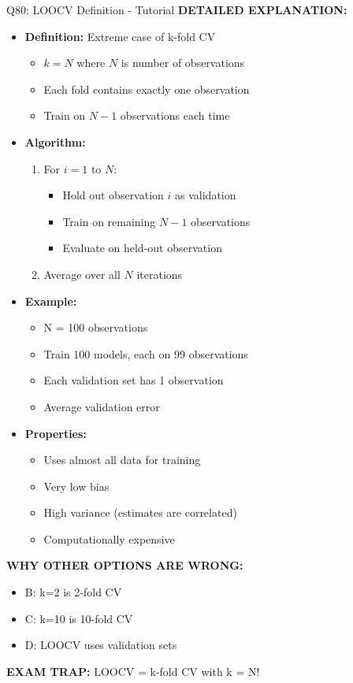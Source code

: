\documentclass[8pt]{beamer}
\begin{document}
\begin{frame}{Q80: LOOCV Definition - Tutorial}
		\vspace{0.05cm}
		\textbf{DETAILED EXPLANATION:}
		\begin{itemize}
			\item \textbf{Definition:} Extreme case of k-fold CV
			\begin{itemize}
				\item $k = N$ where $N$ is number of observations
				\item Each fold contains exactly one observation
				\item Train on $N-1$ observations each time
			\end{itemize}
			\item \textbf{Algorithm:}
			\begin{enumerate}
				\item For $i = 1$ to $N$:
				\begin{itemize}
					\item Hold out observation $i$ as validation
					\item Train on remaining $N-1$ observations
					\item Evaluate on held-out observation
				\end{itemize}
				\item Average over all $N$ iterations
			\end{enumerate}
			\item \textbf{Example:}
			\begin{itemize}
				\item N = 100 observations
				\item Train 100 models, each on 99 observations
				\item Each validation set has 1 observation
				\item Average validation error
			\end{itemize}
			\item \textbf{Properties:}
			\begin{itemize}
				\item Uses almost all data for training
				\item Very low bias
				\item High variance (estimates are correlated)
				\item Computationally expensive
			\end{itemize}
		\end{itemize}
		
		\vspace{0.05cm}
		\textcolor{myred}{\textbf{WHY OTHER OPTIONS ARE WRONG:}}
		\begin{itemize}
			\item \textcolor{myred}{B:} k=2 is 2-fold CV
			\item \textcolor{myred}{C:} k=10 is 10-fold CV
			\item \textcolor{myred}{D:} LOOCV uses validation sets
		\end{itemize}
		
		\textcolor{myred}{\textbf{EXAM TRAP:}} LOOCV = k-fold CV with k = N!
	\end{frame}
	
\end{document}
